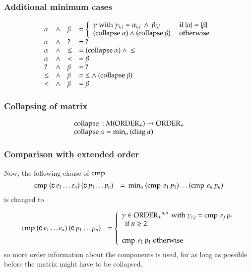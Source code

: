 \subsubsection{Additional minimum cases}
\[
\begin{array}{llll}
\alpha  & \wedge &\beta & = \left\{ \begin{array}{ll}
                          \gamma \mbox{ with } \gamma_{i,j} = \alpha_{i,j} \: \wedge \: \beta_{i,j} & \mbox{ if } \vert \alpha \vert = \vert \beta \vert \\
                          (\mathrm{collapse}\: \alpha) \wedge (\mathrm{collapse}\: \beta) & \mbox{ otherwise}  
                          \end{array}\right.\\ 
\alpha  & \wedge & ?     & = \: ? \\
\alpha  & \wedge & \leq  & = (\mathrm{collapse}\: \alpha) \: \wedge \: \leq \\
\alpha  & \wedge & <     & = \beta \\
?       & \wedge & \beta & = \: ? \\
\leq    & \wedge & \beta & = \: \leq \wedge \: (\mathrm{collapse}\: \beta)\\
<       & \wedge & \beta & = \beta \\
\end{array}
\]

\subsubsection{Collapsing of matrix}
\[
\begin{array}{ll}
\multicolumn{2}{l}{\coll : M(\opl) \ra \opl}\\
\coll \alpha = \info \: (\diag \alpha) 
\end{array}
\]

\subsubsection{Comparison with extended order}
\noindent Now, the following clause of $\operatorname{cmp}$   
\[
\begin{array}[t]{ll}
\operatorname{cmp} \: (\mathsf{c} \: e_1 \ldots e_n) \: (\mathsf{c} \: p_1 \ldots p_n ) & = \: \operatorname{min_o} \: (\operatorname{cmp} \: e_1 \: p_1) \ldots (\operatorname{cmp} \: e_n \: p_n)\end{array}
\]
is changed to

\[
\begin{array}[t]{ll}
\operatorname{cmp} \: (\mathsf{c} \: e_1 \ldots e_n) \: (\mathsf{c} \: p_1 \ldots p_n ) & = 
\left\{\begin{array}{l} \gamma \in \operatorname{ORDER_{+}}^{n,n} \mbox{ with } \gamma_{i,j} = \operatorname{cmp} \: e_j \: p_i \\
\: \mbox{ if } n \geq 2 \\
\\
\operatorname{cmp} \: e_1 \: p_1 \mbox { otherwise}
\end{array}
\right.
\end{array}
\]
so more order information about the components is used, for as long as possible before the matrix might have to be collapsed.
